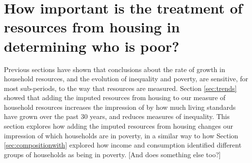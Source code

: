 \section{How important is the treatment of resources from housing in determining who is poor?}\label{sec:housing}

Previous sections have shown that conclusions about the rate of growth in household resources, and the evolution of inequality and poverty, are sensitive, for most sub-periods, to the way that resources are measured. Section \ref{sec:trends} showed that adding the imputed resources from housing to our measure of household resources increases the impression of by how much living standards have grown over the past 30 years, and reduces measures of inequality. This section explores how adding the imputed resources from housing changes our impression of which households are in poverty, in a similar way to how Section \ref{sec:compositionwith} explored how income and consumption identified different groups of households as being in poverty. [And does something else too?]

